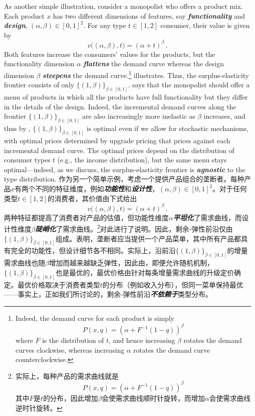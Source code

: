 \documentclass[12pt,letterpaper]{article}
\newenvironment{original}{\color{black}\noindent}{}
\newenvironment{translation}{\color{blue}\noindent}{}
\theoremstyle{plain}
\theoremstyle{definition}
\theoremstyle{remark}
\renewcommand{\1}{\mathds{1}}
\theoremstyle{definition}
\begin{document}
\begin{original}
As another simple illustration, consider a monopolist who offers a product mix. Each product $x$ has two different dimensions of features, say \textit{\textbf{functionality}} and \textit{\textbf{design}}, $(\alpha, \beta) \in [0, 1]^2$. For any type $t\in[1, 2]$ consumer, their value is given by
\[v\big((\alpha, \beta), t\big) = (\alpha + t)^{\beta}\,.\]
Both features increase the consumers' values for the products, but the functionality dimension $\alpha$ \textit{\textbf{flattens}} the demand curve whereas the design dimension $\beta$ \textit{\textbf{steepens}} the demand curve.\footnote{Indeed, the demand curve for each product is simply
\[P(x, q) = (\alpha + F^{-1}(1-q))^{\beta}\]
where $F$ is the distribution of $t$, and hence increasing $\beta$ rotates the demand curves clockwise, whereas increasing $\alpha$ rotates the demand curve counterclockwise.
}  illustrates. Thus, the surplus-elasticity frontier consists of only $\{(1, \beta)\}_{\beta\in[0,1]}$.  says that the monopolist should offer a menu of products in which all the products have full functionality but they differ in the details of the design. Indeed, the incremental demand curves along the frontier $\{(1, \beta)\}_{\beta\in[0,1]}$ are also increasingly more inelastic as $\beta$ increases, and thus by , $\{(1, \beta)\}_{\beta\in[0,1]}$  is optimal even if we allow for stochastic mechanisms, with optimal prices determined by upgrade pricing that prices against each incremental demand curve. The optimal prices depend on the distribution of consumer types $t$ (e.g., the income distribution), but the same menu stays optimal---indeed, as we discuss, the surplus-elasticity frontier is \textit{\textbf{agnostic}} to the type distribution.
\end{original}
\begin{translation}
作为另一个简单示例，考虑一个提供产品组合的垄断者。每种产品$x$有两个不同的特征维度，例如\textit{\textbf{功能性}}和\textit{\textbf{设计性}}，$(\alpha, \beta) \in [0, 1]^2$。对于任何类型$t\in[1, 2]$的消费者，其价值由下式给出
\[v\big((\alpha, \beta), t\big) = (\alpha + t)^{\beta}\,.\]
两种特征都提高了消费者对产品的估值，但功能性维度$\alpha$\textit{\textbf{平坦化}}了需求曲线，而设计性维度$\beta$\textit{\textbf{陡峭化}}了需求曲线。\footnote{实际上，每种产品的需求曲线就是
\[P(x, q) = (\alpha + F^{-1}(1-q))^{\beta}\]
其中$F$是$t$的分布，因此增加$\beta$会使需求曲线顺时针旋转，而增加$\alpha$会使需求曲线逆时针旋转。}对此进行了说明。因此，剩余-弹性前沿仅由$\{(1, \beta)\}_{\beta\in[0,1]}$组成。表明，垄断者应当提供一个产品菜单，其中所有产品都具有完全的功能性，但设计细节各不相同。实际上，沿前沿$\{(1, \beta)\}_{\beta\in[0,1]}$的增量需求曲线也随$\beta$增加而越来越缺乏弹性，因此由，即便允许随机机制，$\{(1, \beta)\}_{\beta\in[0,1]}$也是最优的，最优价格由针对每条增量需求曲线的升级定价确定。最优价格取决于消费者类型$t$的分布（例如收入分布），但同一菜单保持最优——事实上，正如我们所讨论的，剩余-弹性前沿\textit{\textbf{不依赖于}}类型分布。
\end{translation}
\end{document}
